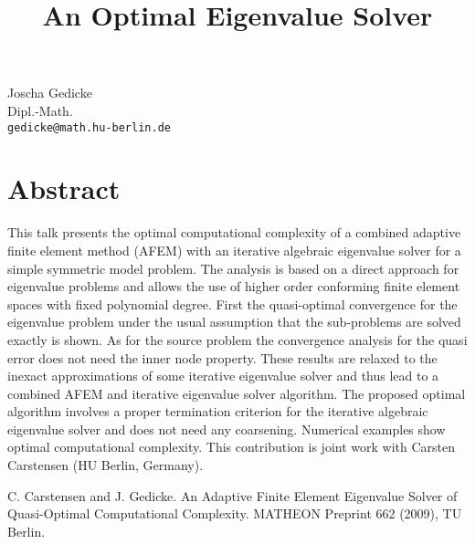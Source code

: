\title{An Optimal Eigenvalue Solver}
 \author{} \institute{}
\maketitle
\begin{center}
{\large Joscha Gedicke}\\
Dipl.-Math.\\
{\tt gedicke@math.hu-berlin.de}

\end{center}

\section*{Abstract}

This talk presents the optimal computational complexity of a combined adaptive finite
element method (AFEM) with an iterative algebraic eigenvalue solver for a simple
symmetric model problem. The analysis is based on a direct approach for eigenvalue
problems and allows the use of higher order conforming finite element spaces with fixed
polynomial degree. First the quasi-optimal convergence for the eigenvalue problem
under the usual assumption that the sub-problems are solved exactly is shown. As for
the source problem the convergence analysis for the quasi error does not need the inner
node property. These results are relaxed to the inexact approximations of some iterative
eigenvalue solver and thus lead to a combined AFEM and iterative eigenvalue solver
algorithm. The proposed optimal algorithm involves a proper termination criterion for
the iterative algebraic eigenvalue solver and does not need any coarsening. Numerical
examples show optimal computational complexity.
This contribution is joint work with Carsten Carstensen (HU Berlin, Germany).


\begin{thebibliography}{10}

{\sc C. Carstensen and J. Gedicke}. {An Adaptive Finite Element Eigenvalue Solver of Quasi-Optimal Computational Complexity}. MATHEON Preprint 662 (2009), TU Berlin.

\end{thebibliography}
